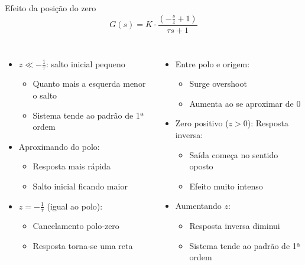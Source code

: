 \begin{frame}{Efeito da posição do zero}
  \begin{equation*}
    G(s) = K \cdot \frac{\left(-\frac{s}{z} + 1\right)}{\tau s + 1}
  \end{equation*}
  \begin{columns}
    \begin{itemize}
      \item $z \ll -\frac{1}{\tau}$: salto inicial pequeno
        \begin{itemize}
          \item Quanto mais a esquerda menor o salto
          \item Sistema tende ao padrão de 1ª ordem
        \end{itemize}
      \item Aproximando do polo:
        \begin{itemize}
          \item Resposta mais rápida
          \item Salto inicial ficando maior
        \end{itemize}
      \item $z = -\frac{1}{\tau}$ (igual ao polo):
        \begin{itemize}
          \item Cancelamento polo-zero
          \item Resposta torna-se uma reta
        \end{itemize}
    \end{itemize}
    \begin{itemize}
      \item Entre polo e origem:
        \begin{itemize}
          \item Surge overshoot
          \item Aumenta ao se aproximar de $0$
        \end{itemize}
      \item Zero positivo ($z > 0$): Resposta inversa:
        \begin{itemize}
          \item Saída começa no sentido oposto
          \item Efeito muito intenso
        \end{itemize}
      \item Aumentando $z$:
        \begin{itemize}
          \item Resposta inversa diminui
          \item Sistema tende ao padrão de 1ª ordem
        \end{itemize}
    \end{itemize}
  \end{columns}
\end{frame}
